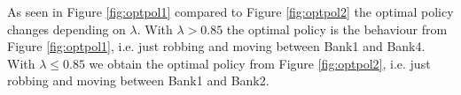 \documentclass{article}
\begin{document}
As seen in Figure \ref{fig:optpol1} compared to Figure \ref{fig:optpol2} the optimal policy changes depending on $\lambda$. With $\lambda > 0.85$ the optimal policy is the behaviour from Figure \ref{fig:optpol1}, i.e. just robbing and moving between Bank1 and Bank4. 
With $\lambda \leq 0.85$ we obtain the optimal policy from Figure \ref{fig:optpol2}, i.e. just robbing and moving between Bank1 and Bank2. 
\end{document}
